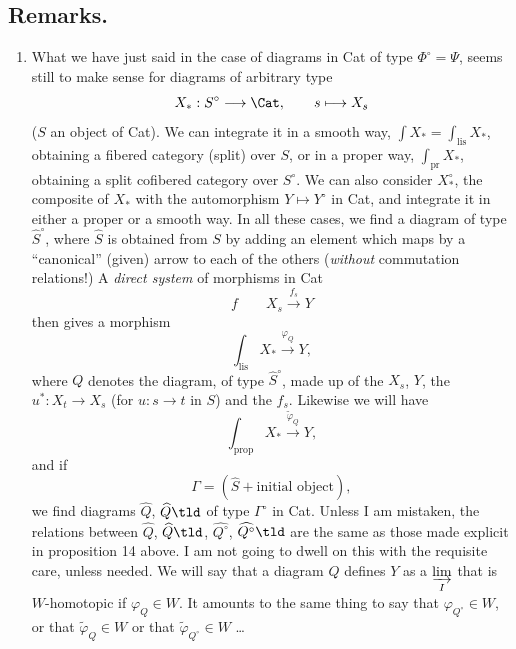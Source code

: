 \subsection*{Remarks.}

\begin{enumerate}
\item[1)] What we have just said in the case of diagrams in Cat of type $\Phi^\circ = \Psi$, seems still to make sense for diagrams of arbitrary type
\[
X_* : S^\circ \longrightarrow \Cat, \qquad s \longmapsto X_s
\]
($S$ an object of Cat). We can integrate it in a smooth way, $\int X_* = \int_{\mathrm{lis}} X_*$, obtaining a fibered category (split) over $S$, or in a proper way, $\int_{\mathrm{pr}} X_*$, obtaining a split cofibered category over $S^\circ$. We can also consider $X_*^\circ$, the composite of $X_*$ with the automorphism $Y \longmapsto Y^\circ$ in Cat, and integrate it in either a proper or a smooth way. In all these cases, we find a diagram of type $\widehat{S}^\circ$, where $\widehat{S}$ is obtained from $S$ by adding an element which maps by a ``canonical'' (given) arrow to each of the others (\textit{without} commutation relations!) A
\textit{direct system} of morphisms in Cat
\[
f \qquad X_s \xrightarrow{f_s} Y
\]
then gives a morphism
\[
\int_{\mathrm{lis}} X_* \xrightarrow{\varphi_Q} Y,
\]
where $Q$ denotes the diagram, of type $\widehat{S}^\circ$, made up of the $X_s$, $Y$, the $u^* : X_t \longrightarrow X_s$ (for $u : s \longrightarrow t$ in $S$) and the $f_s$. Likewise we will have
\[
\int_{\mathrm{prop}} X_* \xrightarrow{\tilde{\varphi}_Q} Y,
\]
and if
\[
\Gamma = (\widehat{S} + \text{initial object}),
\]
we find diagrams $\widehat{Q}$, $\widehat{Q}\tld$ of type $\Gamma^\circ$ in Cat. Unless I am mistaken, the relations between $\widehat{Q}$, $\widehat{Q}\tld$, $\widehat{Q^\circ}$, $\widehat{Q^\circ}\tld$ are the same as those made explicit in proposition 14 above. I am not going to dwell on this with the requisite care, unless needed. We will say that a diagram $Q$ defines $Y$ as a $\varinjlim\limits_{I}$ that is $W$-homotopic if $\varphi_Q \in W$. It amounts to the same thing to say that $\varphi_{Q^\circ} \in W$, or that $\tilde{\varphi}_Q \in W$ or that $\tilde{\varphi}_{Q^\circ} \in W$ \dots
{}


\end{enumerate}
